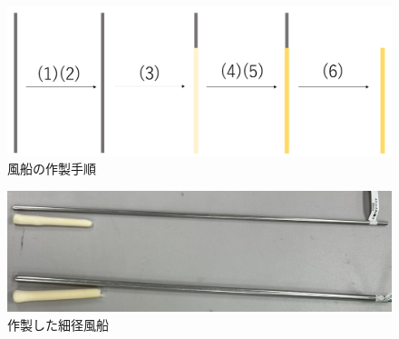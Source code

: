 \begin{figure}[!h]
  \centering  %
  \includegraphics[scale=0.35]{pic/tezyun.PNG}
  \caption{風船の作製手順}
  \label{fig:4}
\end{figure}
\begin{figure}[!t]
  \centering  %
  \includegraphics[scale=0.28]{pic/balloon.jpg}
  \caption{作製した細径風船}
  \label{fig:5}
\end{figure}
